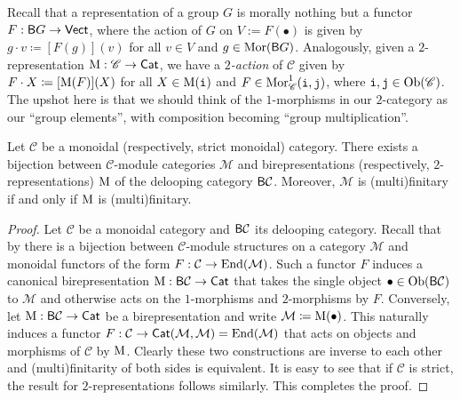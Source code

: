 \noindent\begin{remark} Recall that a representation of a group $G$ is morally nothing but a functor\linebreak $F : \textup{\textsf{B}}G \to \textup{\textsf{Vect}}$, where the action of $G$ on $V := F(\bullet)$ is given by $g \cdot v \coloneqq [F(g)](v)$ for all $v \in V$ and $g \in \textup{Mor}(\textup{\textsf{B}}G)$. Analogously, given a $2$-representation $\textup{M} : \mathscr{C} \to \textup{\textsf{Cat}}$, we have a {\em $2$-action} of $\mathscr{C}$ given by $F \cdot X \coloneqq [\textup{M}(F)](X)$ for all $X \in \textup{M}(\textup{\texttt{i}})$ and $F \in \textup{Mor}_\mathscr{C}^1(\textup{\texttt{i}}, \textup{\texttt{j}})$, where $\textup{\texttt{i}}, \textup{\texttt{j}} \in \textup{Ob}(\mathscr{C})$. The upshot here is that we should think of the $1$-morphisms in our $2$-category as our ``group elements'', with composition becoming ``group multiplication''.\\ %
\end{remark}

\noindent\begin{proposition}\label{ModuleBireps} Let $\mathcal{C}$ be a monoidal (respectively, strict monoidal) category. There exists a bijection between $\mathcal{C}$-module categories $\mathcal{M}$ and birepresentations (respectively, $2$-representations) $\textup{M}$ of the delooping category $\textup{\textsf{B}}\mathcal{C}$. Moreover, $\mathcal{M}$ is (multi)finitary if and only if $\textup{M}$ is (multi)finitary.\\
\end{proposition}

\noindent\begin{proof} Let $\mathcal{C}$ be a monoidal category and $\textup{\textsf{B}}\mathcal{C}$ its delooping category. Recall that by \cite[Proposition 7.1.3]{EGNO16} there is a bijection between $\mathcal{C}$-module structures on a category $\mathcal{M}$ and monoidal functors of the form $F : \mathcal{C} \to \textup{End}(\mathcal{M})$. Such a functor $F$ induces a canonical birepresentation $\textup{M} : \textup{\textsf{B}}\mathcal{C} \to \textup{\textsf{Cat}}$ that takes the single object $\bullet \in \textup{Ob}(\textup{\textsf{B}}\mathcal{C})$ to $\mathcal{M}$ and otherwise acts on the $1$-morphisms and $2$-morphisms by $F$. Conversely, let $\textup{M} : \textup{\textsf{B}}\mathcal{C} \to \textup{\textsf{Cat}}$ be a birepresentation and write $\mathcal{M} \coloneqq \textup{M}(\bullet)$. This naturally induces a functor $F : \mathcal{C} \to \textup{\textsf{Cat}}(\mathcal{M}, \mathcal{M}) = \textup{End}(\mathcal{M})$ that acts on objects and morphisms of $\mathcal{C}$ by $\textup{M}$. Clearly these two constructions are inverse to each other and (multi)finitarity of both sides is equivalent. It is easy to see that if $\mathcal{C}$ is strict, the result for $2$-representations follows similarly. This completes the proof.
\end{proof}\\

